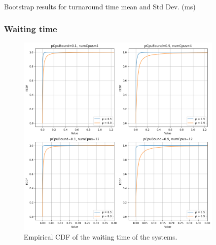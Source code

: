 \begin{table}[H]
    \centering
    \scriptsize
    
    \caption{Bootstrap results for turnaround time mean and Std Dev. (ms)}
    \label{tab:sjfTurn}
\end{table}


\subsubsection{Waiting time}


\begin{figure}[H]
    \captionsetup{type=figure}
    \centering
    \includegraphics[width=0.9\textwidth]{./images/04/sjf/wait/ecdf.png}
    \caption{Empirical CDF of the waiting time of the systems.}
    \label{fig:sjfWaitEcdf}
\end{figure}

